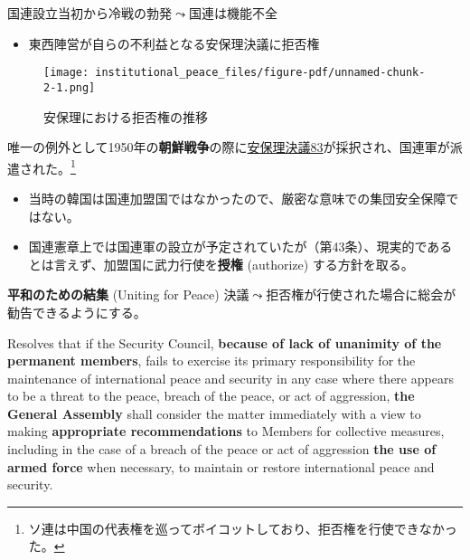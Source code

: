 \documentclass[
  xelatex,
  ja=standard]{bxjsarticle}
\providecommand{\tightlist}{%
  \setlength{\itemsep}{0pt}\setlength{\parskip}{0pt}}\usepackage{longtable,booktabs,array}
\begin{document}
国連設立当初から冷戦の勃発\(\leadsto\)国連は機能不全

\begin{itemize}
\tightlist
\item
  東西陣営が自らの不利益となる安保理決議に拒否権
\end{itemize}

\begin{figure}[htpb]

{\centering \texttt{[image: institutional\_peace\_files/figure-pdf/unnamed-chunk-2-1.png]}

}

\caption{安保理における拒否権の推移}

\end{figure}

唯一の例外として1950年の\textbf{朝鮮戦争}の際に\href{https://ja.wikisource.org/wiki/\%E5\%9B\%BD\%E9\%9A\%9B\%E9\%80\%A3\%E5\%90\%88\%E5\%AE\%89\%E5\%85\%A8\%E4\%BF\%9D\%E9\%9A\%9C\%E7\%90\%86\%E4\%BA\%8B\%E4\%BC\%9A\%E6\%B1\%BA\%E8\%AD\%B083}{安保理決議83}が採択され、国連軍が派遣された。\footnote{ソ連は中国の代表権を巡ってボイコットしており、拒否権を行使できなかった。}

\begin{itemize}
\tightlist
\item
  当時の韓国は国連加盟国ではなかったので、厳密な意味での集団安全保障ではない。
\item
  国連憲章上では国連軍の設立が予定されていたが（第43条）、現実的であるとは言えず、加盟国に武力行使を\textbf{授権}
  (authorize) する方針を取る。
\end{itemize}

\textbf{平和のための結集} (Uniting for Peace)
決議\(\leadsto\)拒否権が行使された場合に総会が勧告できるようにする。

\begin{tcolorbox}[enhanced jigsaw, opacityback=0, bottomtitle=1mm, arc=.35mm, opacitybacktitle=0.6, title=\textcolor{quarto-callout-note-color}{\faInfo}\hspace{0.5em}{平和のための結集決議　主文1}, bottomrule=.15mm, coltitle=black, toptitle=1mm, titlerule=0mm, leftrule=.75mm, colframe=quarto-callout-note-color-frame, breakable, left=2mm, rightrule=.15mm, toprule=.15mm, colbacktitle=quarto-callout-note-color!10!white, colback=white]

Resolves that if the Security Council, \textbf{because of lack of
unanimity of the permanent members}, fails to exercise its primary
responsibility for the maintenance of international peace and security
in any case where there appears to be a threat to the peace, breach of
the peace, or act of aggression, \textbf{the General Assembly} shall
consider the matter immediately with a view to making
\textbf{appropriate recommendations} to Members for collective measures,
including in the case of a breach of the peace or act of aggression
\textbf{the use of armed force} when necessary, to maintain or restore
international peace and security.

\end{tcolorbox}
\end{document}
